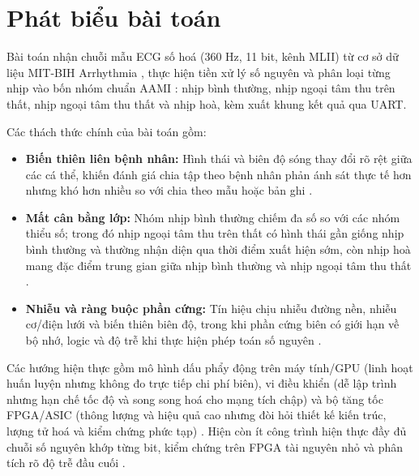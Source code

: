 \section{Phát biểu bài toán}\label{sec:baitoan}

Bài toán nhận chuỗi mẫu ECG số hoá ($360\text{ Hz}$, 11 bit, kênh MLII) từ cơ sở dữ liệu MIT-BIH Arrhythmia \cite{moody2001impact}, thực hiện tiền xử lý số nguyên và phân loại từng nhịp vào bốn nhóm chuẩn AAMI \cite{aami2012ec57, dechazal2004automatic}: nhịp bình thường, nhịp ngoại tâm thu trên thất, nhịp ngoại tâm thu thất và nhịp hoà, kèm xuất khung kết quả qua UART.

Các thách thức chính của bài toán gồm:
\begin{itemize}
	\item \textbf{Biến thiên liên bệnh nhân:} Hình thái và biên độ sóng thay đổi rõ rệt giữa các cá thể, khiến đánh giá chia tập theo bệnh nhân phản ánh sát thực tế hơn nhưng khó hơn nhiều so với chia theo mẫu hoặc bản ghi \cite{dechazal2004automatic, li2026lightweight}.
	\item \textbf{Mất cân bằng lớp:} Nhóm nhịp bình thường chiếm đa số so với các nhóm thiểu số; trong đó nhịp ngoại tâm thu trên thất có hình thái gần giống nhịp bình thường và thường nhận diện qua thời điểm xuất hiện sớm, còn nhịp hoà mang đặc điểm trung gian giữa nhịp bình thường và nhịp ngoại tâm thu thất \cite{dechazal2004automatic, lin2017focal, li2026lightweight}.
	\item \textbf{Nhiễu và ràng buộc phần cứng:} Tín hiệu chịu nhiễu đường nền, nhiễu cơ/điện lưới và biến thiên biên độ, trong khi phần cứng biên có giới hạn về bộ nhớ, logic và độ trễ khi thực hiện phép toán số nguyên \cite{pantompkins1985realtime, jacob2018quantization, hariri2026hardware}.
\end{itemize}

Các hướng hiện thực gồm mô hình dấu phẩy động trên máy tính/GPU (linh hoạt huấn luyện nhưng không đo trực tiếp chi phí biên), vi điều khiển (dễ lập trình nhưng hạn chế tốc độ và song song hoá cho mạng tích chập) và bộ tăng tốc FPGA/ASIC (thông lượng và hiệu quả cao nhưng đòi hỏi thiết kế kiến trúc, lượng tử hoá và kiểm chứng phức tạp) \cite{kiranyaz2016realtime, jacob2018quantization, hariri2026hardware, liu2025fpga1dcnn}. Hiện còn ít công trình hiện thực đầy đủ chuỗi số nguyên khớp từng bit, kiểm chứng trên FPGA tài nguyên nhỏ và phân tích rõ độ trễ đầu cuối \cite{liu2025fpga1dcnn, liu2023fully}.
